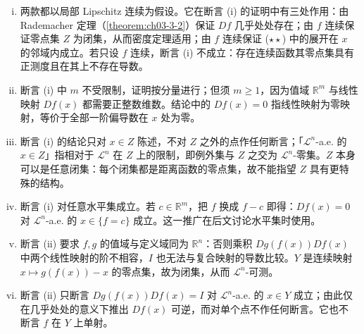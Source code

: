 \documentclass[../../main.tex]{subfiles}%
\begin{document}
\begin{remark}\label{remark:ch03-thm-3-3-条件}
\begin{enumerate}[(i)]
\item 两款都以局部 Lipschitz 连续为假设。它在断言 (i) 的证明中有三处作用：由 Rademacher 定理（\cref{theorem:ch03-3-2}）保证 $Df$ 几乎处处存在；由 $f$ 连续保证零点集 $Z$ 为闭集，从而密度定理适用；由 $f$ 连续保证 ($\star\star$) 中的展开在 $x$ 的邻域内成立。若只设 $f$ 连续，断言 (i) 不成立：存在连续函数其零点集具有正测度且在其上不存在导数。%
\item 断言 (i) 中 $m$ 不受限制，证明按分量进行；但须 $m\geqslant1$，因为值域 $\mathbb{R}^m$ 与线性映射 $Df(x)$ 都需要正整数维数。结论中的 $Df(x)=0$ 指线性映射为零映射，等价于全部一阶偏导数在 $x$ 处为零。
\item 断言 (i) 的结论只对 $x\in Z$ 陈述，不对 $Z$ 之外的点作任何断言；「$\mathcal{L}^n$-a.e. 的 $x\in Z$」指相对于 $\mathcal{L}^n$ 在 $Z$ 上的限制，即例外集与 $Z$ 之交为 $\mathcal{L}^n$-零集。$Z$ 本身可以是任意闭集：每个闭集都是距离函数的零点集，故不能指望 $Z$ 具有更特殊的结构。
\item 断言 (i) 对任意水平集成立。若 $c\in\mathbb{R}^m$，把 $f$ 换成 $f-c$ 即得：$Df(x)=0$ 对 $\mathcal{L}^n$-a.e. 的 $x\in\{f=c\}$ 成立。这一推广在后文讨论水平集时使用。
\item 断言 (ii) 要求 $f,g$ 的值域与定义域同为 $\mathbb{R}^n$：否则乘积 $Dg(f(x))Df(x)$ 中两个线性映射的阶不相容，$I$ 也无法与复合映射的导数比较。$Y$ 是连续映射 $x\mapsto g(f(x))-x$ 的零点集，故为闭集，从而 $\mathcal{L}^n$-可测。
\item 断言 (ii) 只断言 $Dg(f(x))Df(x)=I$ 对 $\mathcal{L}^n$-a.e. 的 $x\in Y$ 成立；由此仅在几乎处处的意义下推出 $Df(x)$ 可逆，而对单个点不作任何断言。它也不断言 $f$ 在 $Y$ 上单射。
\end{enumerate}
\end{remark}
\end{document}
